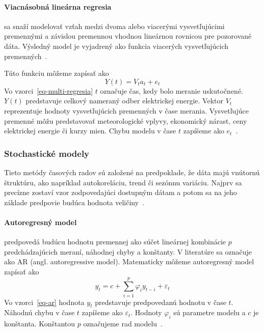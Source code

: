 \documentclass[a4paper,slovak,12pt,appendix]{article}
\begin{document}
\paragraph{Viacnásobná lineárna regresia} sa snaží modelovať vzťah medzi dvoma
alebo viacerými vysvetľujúcimi premennými a závislou premennou vhodnou
lineárnou rovnicou pre pozorované dáta. Výsledný model je vyjadrený ako funkcia
viacerých vysvetľujúcich premenných~\cite{Grmanova2016}.

Túto funkciu môžeme zapísať ako
\begin{equation}
  Y(t) = V_t a_t + e_t
  \label{eq-multi-regresia}
\end{equation}
Vo vzorci~\ref{eq-multi-regresia} $t$ označuje čas, kedy bolo meranie
uskutočnené. $Y(t)$ predstavuje celkový nameraný odber elektrickej energie.
Vektor $V_t$ reprezentuje hodnoty vysvetľujúcich premenných v čase merania.
Vysvetľujúce premenné môžu predstavovať meteorologické vplyvy, ekonomický
nárast, ceny elektrickej energie či kurzy mien. Chybu modelu v čase $t$
zapíšeme ako $e_t$~\cite{KumarSingh2013, Mahalakshmi2016}.


\subsubsection{Stochastické modely}
\label{stochastic}
Tieto metódy časových radov sú založené na predpoklade, že dáta majú vnútornú
štruktúru, ako napríklad autokoreláciu, trend či sezónnu variáciu. Najprv sa
precízne zostaví vzor zodpovedajúci dostupným dátam a potom sa na jeho základe
predpovie budúca hodnota veličiny~\cite{KumarSingh2013}.

\paragraph{Autoregresný model} predpovedá budúcu hodnotu premennej ako súčet
lineárnej kombinácie $p$ predchádzajúcich meraní, náhodnej chyby a konštanty.
V literatúre sa označuje ako AR (angl. autoregressive model). Matematicky môžeme
autoregresný model zapísať ako
\begin{equation}
  y_t = c + \sum_{i=1}^{p} \varphi_i y_{t-i} + \varepsilon_t
  \label{eq-ar}
\end{equation}
Vo vzorci~\ref{eq-ar} hodnota $y_t$ predstavuje predpovedanú hodnotu
v čase $t$. Náhodnú chybu v čase $t$ zapíšeme ako $\varepsilon_t$. Hodnoty
$\varphi_i$ sú parametre modelu a $c$ je konštanta. Konštantou $p$ označujeme
rad modelu~\cite{Agrawal2013}.
\end{document}
